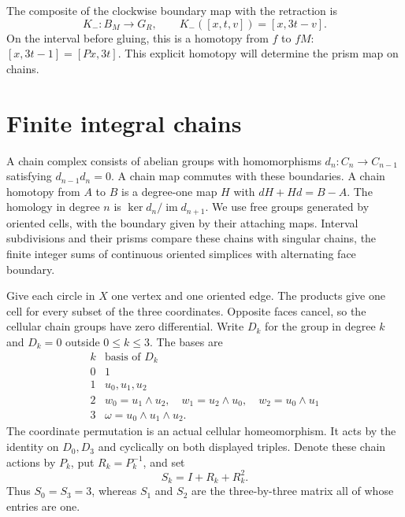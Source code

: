 \documentclass[11pt]{article}
\numberwithin{equation}{section}
\providecommand{\im}{\operatorname{im}}
\begin{document}
The composite of the clockwise boundary map with the retraction is
\begin{equation}\label{eq:actual-prism}
 K_-:B_M\longrightarrow G_R,
 \qquad K_-([x,t,v])=[x,3t-v].
\end{equation}
On the interval before gluing, this is a homotopy from $f$ to $fM$:
$[x,3t-1]=[Px,3t]$. This explicit homotopy will determine the
prism map on chains.

\section{Finite integral chains}

A chain complex consists of abelian groups with homomorphisms
$d_n:C_n\to C_{n-1}$ satisfying $d_{n-1}d_n=0$. A chain map
commutes with these boundaries. A chain homotopy from $A$ to $B$
is a degree-one map $H$ with $dH+Hd=B-A$.
The homology in degree $n$ is $\ker d_n/\im d_{n+1}$.
We use free groups generated by oriented cells, with the boundary
given by their attaching maps. Interval subdivisions and their prisms
compare these chains with singular chains, the finite integer sums
of continuous oriented simplices with alternating face boundary.

Give each circle in $X$ one vertex and one oriented edge. The products
give one cell for every subset of the three coordinates. Opposite
faces cancel, so the cellular chain groups have zero differential.
Write $D_k$ for the group in degree $k$ and $D_k=0$ outside $0\le k\le3$.
The bases are
\begin{equation}\label{eq:cell-bases}
 \begin{array}{c|c}
 k&\text{basis of }D_k\\ \hline
 0&1\\
 1&u_0,u_1,u_2\\
 2&w_0=u_1\wedge u_2,
     \quad w_1=u_2\wedge u_0,
     \quad w_2=u_0\wedge u_1\\
 3&\omega=u_0\wedge u_1\wedge u_2.
 \end{array}
\end{equation}
The coordinate permutation is an actual cellular homeomorphism. It acts
by the identity on $D_0,D_3$ and cyclically on both displayed triples.
Denote these chain actions by $P_k$, put $R_k=P_k^{-1}$, and set
\begin{equation}\label{eq:norm}
                 S_k=I+R_k+R_k^2.
\end{equation}
Thus $S_0=S_3=3$, whereas $S_1$ and $S_2$ are the three-by-three
matrix all of whose entries are one.
\end{document}
